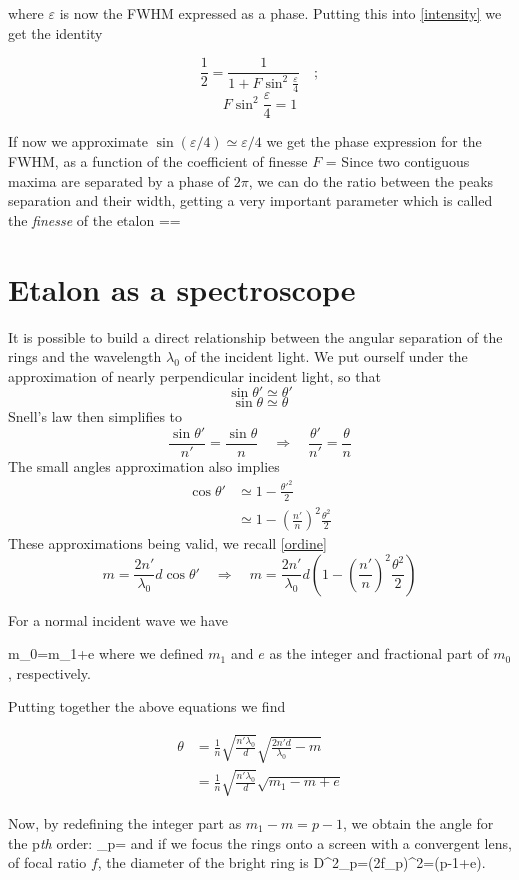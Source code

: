 where $\varepsilon$ is now the FWHM expressed as a phase. Putting this into \cref{intensity} we get the identity

$$\frac{1}{2}=\frac{1}{1+F\sin^2\frac{\varepsilon}{4}}\quad;$$ $$F\sin^2\frac{\varepsilon}{4}=1$$

If now we approximate $\sin\left(\varepsilon/4\right)\simeq\varepsilon/4$ we get the phase expression for the FWHM, as a function of the coefficient of finesse $F$
\mate
\varepsilon=
\atem
Since two contiguous maxima are separated by a phase of $2\pi$, we can do the ratio between the peaks separation and their width, getting a very important parameter which is called the \textit{finesse} of the etalon
\mate
{}\equiv\frac{2\pi}{\varepsilon}==
\label{finesse}
\atem
	\section{Etalon as a spectroscope}\label{etalonspec}
It is possible to build a direct relationship between the angular separation of the rings and the wavelength $\lambda_0$ of the incident light.
We put ourself under the approximation of nearly perpendicular incident light, so that
$$\sin\theta'\simeq\theta'$$$$\sin\theta\simeq\theta$$
Snell's law then simplifies to
$$\frac{\sin\theta'}{n'}=\frac{\sin\theta}{n}\quad\Rightarrow\quad\frac{\theta'}{n'}=\frac{\theta}{n}$$
The small angles approximation also implies
\begin{align} 
\cos\theta'&\simeq1-\frac{\theta'^2}{2}\nonumber\\
&\simeq1-\left(\frac{n'}{n}\right)^2\frac{\theta^2}{2}\nonumber
\end{align}
These approximations being valid, we recall \cref{ordine}
$$m=\frac{2n'}{\lambda_0}d\cos\theta'\quad\Rightarrow\quad m=\frac{2n'}{\lambda_0}d\left(1-\left(\frac{n'}{n}\right)^2\frac{\theta^2}{2}\right)$$

For a normal incident wave we have

\mate
m_0=\equiv m_1+e
\atem
where we defined $m_1$ and $e$ as the integer and fractional part of $m_0$, respectively.

Putting together the above equations we find 

\begin{align}
\theta&=\frac{1}{n}\sqrt{\frac{n'\lambda_0}{d}}\sqrt{\frac{2n'd}{\lambda_0}-m}\nonumber\\
&=\frac{1}{n}\sqrt{\frac{n'\lambda_0}{d}}\sqrt{m_1-m+e}
\end{align}

Now, by redefining the integer part as $m_1-m=p-1$, we obtain the angle for the p\textit{th} order:
\mate
\theta_p=
\atem
and if we focus the rings onto a screen with a convergent lens, of focal ratio $f$, the diameter of the bright ring is
\mate
D^2_p=(2f\theta_p)^2=(p-1+e).
\atem
